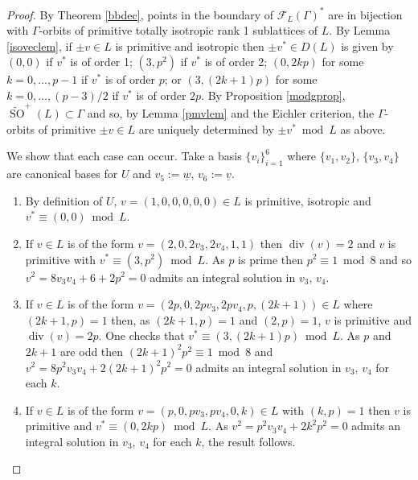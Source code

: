\documentclass[11pt]{article}
\newcommand{\fc}{\mathcal{F}}
\newcommand{\opn}{\operatorname}
\begin{document}
\begin{proof}
  By Theorem \ref{bbdec}, points in the boundary of $\fc_L(\Gamma)^*$ are in bijection with $\Gamma$-orbits of primitive totally isotropic rank 1 sublattices of $L$.
  By Lemma \ref{isoveclem}, if $\pm v \in L$ is primitive and isotropic then $\pm v^* \in D(L)$ is given by 
  $(0,0)$ if $v^*$ is of order 1;
  $(3, p^2)$  if $v^*$ is of order 2;
  $(0, 2kp)$ for some $k=0, \ldots, p-1$  if $v^*$ is of order $p$; or
  $(3, (2k+1)p)$ for some $k=0, \ldots, (p-3)/2$  if $v^*$ is of order $2p$.
  By Proposition \ref{modgprop}, $\widetilde{\opn{SO}}^+(L) \subset \Gamma$ and so, by Lemma \ref{pmvlem} and the Eichler criterion, the $\Gamma$-orbits of primitive $\pm v \in L$ are uniquely determined by $ \pm v^* \bmod{ L}$ as above.

  We show that each case can occur.
  Take a basis $\{v_i \}_{i=1}^6$ where $\{v_1, v_2\}$, $\{v_3, v_4 \}$ are canonical bases for $U$ and $v_5:=\underline{w}$, $v_6:=\underline{v}$.
  \begin{enumerate}
\item By definition of $U$,  $v=(1,0,0,0,0,0) \in L$ is primitive, isotropic and $v^* \equiv (0,0) \bmod{ L}$.
\item If $v \in L$ is of the form $v=(2, 0, 2v_3, 2v_4, 1, 1)$  then $\opn{div}(v) = 2$ and $v$ is primitive with  $v^* \equiv (3, p^2) \bmod{ L}$.
  As $p$ is prime then $p^2 \equiv 1 \bmod{ 8}$ and so
  $v^2=8v_3 v_4 + 6 + 2p^2 = 0$ admits an integral solution in $v_3$, $v_4$.
\item If $v \in L$ is of the form $v = (2p, 0, 2p v_3, 2p v_4, p, (2k+1)) \in L$ where $(2k+1, p) = 1$ then, as $(2k+1, p)=1$ and $(2,p)=1$, $v$ is primitive and $\opn{div}(v)=2p$.
  One checks that  $v^* \equiv (3, (2k+1)p) \bmod{ L}$.
  As $p$ and $2k+1$ are odd then $(2k+1)^2 p^2 \equiv 1 \bmod{ 8}$ and  $v^2=8p^2 v_3 v_4 + 2(2k+1)^2 p^2  = 0$ admits an integral solution in $v_3$, $v_4$ for each $k$.
\item  If $v \in L$ is of the form $v = (p,0, pv_3, pv_4, 0, k) \in L$ with $(k,p)=1$ then $v$ is primitive and  $v^* \equiv (0, 2kp) \bmod{ L}$.
  As $v^2=p^2 v_3 v_4 + 2k^2 p^2 = 0$ admits an integral solution in $v_3$, $v_4$ for each $k$, the result follows.
  \end{enumerate}
\end{proof}
\end{document}
